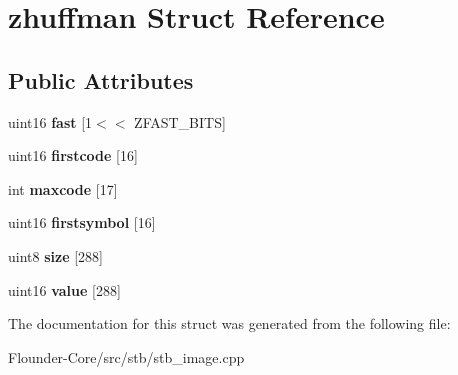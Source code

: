 \hypertarget{structzhuffman}{}\section{zhuffman Struct Reference}
\label{structzhuffman}
\subsection*{Public Attributes}
\begin{DoxyCompactItemize}
\item 
\mbox{\label{structzhuffman_a12d5f92a121b65680e5f0b4027d00c96}} 
uint16 {\bfseries fast} \mbox{[}1$<$$<$ Z\+F\+A\+S\+T\+\_\+\+B\+I\+TS\mbox{]}
\item 
\mbox{\label{structzhuffman_a81f5ae5bd31b40439955de6154572917}} 
uint16 {\bfseries firstcode} \mbox{[}16\mbox{]}
\item 
\mbox{\label{structzhuffman_ac7dd4a2bf01a6e27933dd1cf6b0cc762}} 
int {\bfseries maxcode} \mbox{[}17\mbox{]}
\item 
\mbox{\label{structzhuffman_afbdb21fd99f413fc8f9e58243552fe95}} 
uint16 {\bfseries firstsymbol} \mbox{[}16\mbox{]}
\item 
\mbox{\label{structzhuffman_a46ce4d4a4d7fc41c2560616f6696e9b9}} 
uint8 {\bfseries size} \mbox{[}288\mbox{]}
\item 
\mbox{\label{structzhuffman_acc395b638b700b944c329d71a8b82084}} 
uint16 {\bfseries value} \mbox{[}288\mbox{]}
\end{DoxyCompactItemize}


The documentation for this struct was generated from the following file\+:\begin{DoxyCompactItemize}
\item 
Flounder-\/\+Core/src/stb/stb\+\_\+image.\+cpp\end{DoxyCompactItemize}
